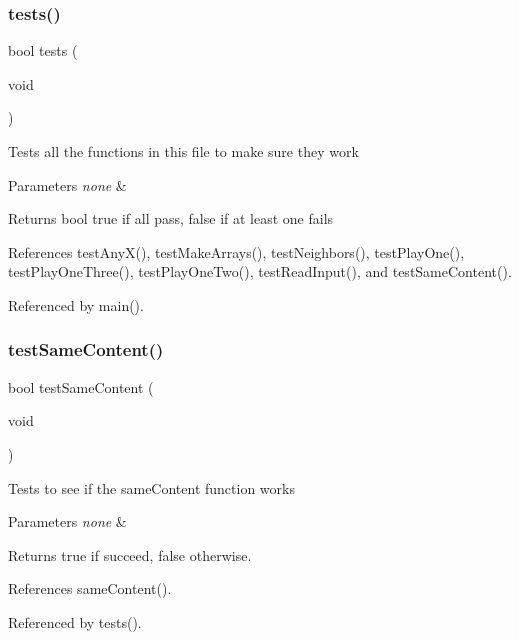 \subsubsection{tests()}
{\footnotesize\ttfamily bool tests (\begin{DoxyParamCaption}\item[{void}]{ }\end{DoxyParamCaption})}

Tests all the functions in this file to make sure they work 
\begin{DoxyParams}{Parameters}
{\em none} & \\
\hline
\end{DoxyParams}
\begin{DoxyReturn}{Returns}
bool true if all pass, false if at least one fails 
\end{DoxyReturn}


References test\+Any\+X(), test\+Make\+Arrays(), test\+Neighbors(), test\+Play\+One(), test\+Play\+One\+Three(), test\+Play\+One\+Two(), test\+Read\+Input(), and test\+Same\+Content().



Referenced by main().

\mbox{\label{tests_8h_a7017056d6783f53023d1f1f0336d3d3e}} 
\subsubsection{test\+Same\+Content()}
{\footnotesize\ttfamily bool test\+Same\+Content (\begin{DoxyParamCaption}\item[{void}]{ }\end{DoxyParamCaption})}

Tests to see if the same\+Content function works 
\begin{DoxyParams}{Parameters}
{\em none} & \\
\hline
\end{DoxyParams}
\begin{DoxyReturn}{Returns}
true if succeed, false otherwise. 
\end{DoxyReturn}


References same\+Content().



Referenced by tests().

